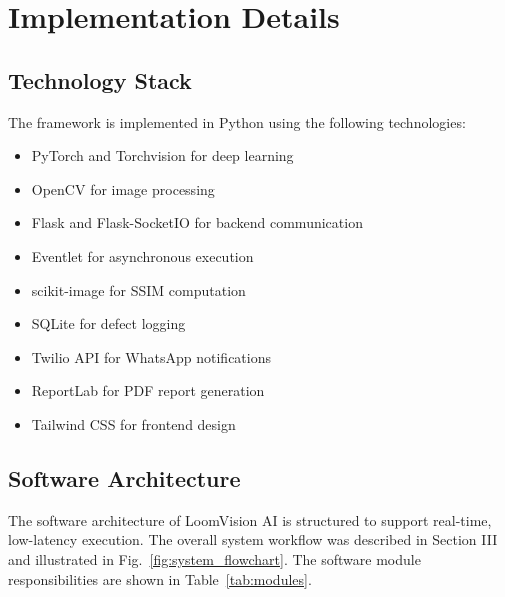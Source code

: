 \documentclass{ieeeaccess}
\begin{document}
\section{Implementation Details}

\subsection{Technology Stack}
The framework is implemented in Python using the following technologies:
\begin{itemize}
    \item PyTorch and Torchvision for deep learning
    \item OpenCV for image processing
    \item Flask and Flask-SocketIO for backend communication
    \item Eventlet for asynchronous execution
    \item scikit-image for SSIM computation
    \item SQLite for defect logging
    \item Twilio API for WhatsApp notifications
    \item ReportLab for PDF report generation
    \item Tailwind CSS for frontend design
\end{itemize}

\subsection{Software Architecture}
The software architecture of LoomVision AI is structured to support real-time, low-latency execution. The overall system workflow was described in Section III and illustrated in Fig.~\ref{fig:system_flowchart}. The software module responsibilities are shown in Table~\ref{tab:modules}.
\end{document}
